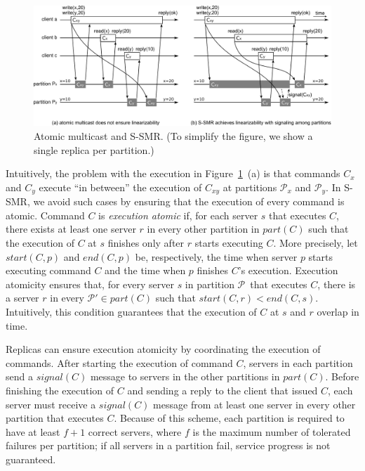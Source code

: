 \documentclass[11pt]{article}
\newcommand{\pp}{$\mathcal{P}$}
\newcommand{\ppm}{\mathcal{P}}
\begin{document}
\begin{figure}
\begin{minipage}[b]{1.0\linewidth} %
\centering
      \includegraphics[width=0.85\linewidth]{mcastssmr_nonlin_linsignal_v3}
\end{minipage}
\caption{Atomic multicast and S-SMR. (To simplify the figure, we show a single replica per partition.)}
\label{fig:mcastnonlinssmr}
\end{figure}

Intuitively, the problem with the execution in Figure~\ref{fig:mcastnonlinssmr}~(a) is that commands $C_x$ and $C_y$ execute ``in between'' the execution of $C_{xy}$ at partitions $\ppm_x$ and $\ppm_y$.
In S-SMR, we avoid such cases by ensuring that the execution of every command is atomic.
%
Command $C$ is \emph{execution atomic} if, for each server $s$ that executes $C$, there exists at least one server $r$ in every other partition in $part(C)$ such that the execution of $C$ at $s$ finishes only after $r$ starts executing $C$.
%
More precisely, let $start(C,p)$ and $end(C,p)$ be, respectively, the time when server $p$ starts executing command $C$ and the time when $p$ finishes $C$'s execution.
Execution atomicity ensures that, for every server $s$ in partition \pp\ that executes $C$, there is a server $r$ in every $\ppm' \in part(C)$ such that \mbox{$start(C,r) < end(C,s)$}.
Intuitively, this condition guarantees that the execution of $C$ at $s$ and $r$ overlap in time.

Replicas can ensure execution atomicity by coordinating the execution of commands.
After starting the execution of command $C$, servers in each partition send a $signal(C)$ message to servers in the other partitions in $part(C)$.
Before finishing the execution of $C$ and sending a reply to the client that issued $C$, each server must receive a $signal(C)$ message from at least one server in every other partition that executes $C$.
Because of this scheme, each partition is required to have at least $f+1$ correct servers, where $f$ is the maximum number of tolerated failures per partition; if all servers in a partition fail, service progress is not guaranteed.
\end{document}
